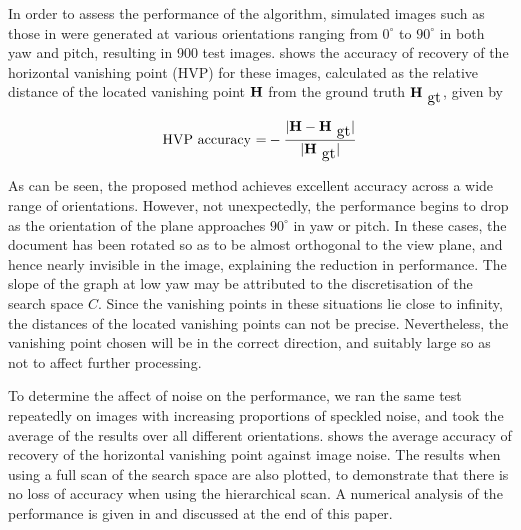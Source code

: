 In order to assess the performance of the algorithm, simulated images such as
those in  were generated at various orientations ranging from
$0^\circ$ to $90^\circ$ in both yaw and pitch, resulting in 900 test images. 
 shows the accuracy of recovery of the horizontal vanishing
point (HVP) for these images, 
calculated as the relative distance of the located vanishing point ${ \bf H }$ 
from the ground truth $\myvec{H}_{\mbox{\small gt}}$, given by

\begin{equation} 
\mbox{HVP accuracy =} -\frac{|\myvec{H}-\myvec{H}_{\mbox{\small gt}}|}{|\myvec{H}_{\mbox{\small gt}}|}
\end{equation}

As can be seen, the proposed method achieves excellent accuracy across a wide
range of orientations. However, not unexpectedly, the performance begins to
drop as the orientation of the plane approaches $90^\circ$ in yaw or pitch. In
these cases, the document has been rotated so as to be almost orthogonal to the
view plane, and hence nearly invisible in the image, explaining the reduction
in performance. The slope of the graph at low yaw may be attributed to the
discretisation of the search space $C$. Since the vanishing points in these
situations lie close to infinity, the distances of the located vanishing points
can not be precise. Nevertheless, the vanishing point chosen will be in the
correct direction, and suitably large so as not to affect further processing.

To determine the affect of noise on the performance, we ran the same test
repeatedly on images with increasing proportions of speckled noise, and took
the average of the results over all different orientations.
 shows the average accuracy of recovery of the
horizontal vanishing point against image noise.  The results when using a full
scan of the search space are also plotted, to demonstrate that there is no loss
of accuracy when using the hierarchical scan.  A numerical analysis of the
performance is given in  and discussed at the end of this
paper.


